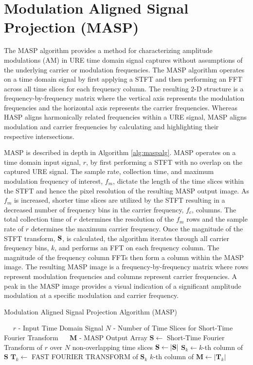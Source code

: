 \section[Modulation Aligned Signal Projection (MASP)]{Modulation Aligned Signal Projection (MASP)}
\label{Modulation Aligned Signal Projection}

The MASP algorithm provides a method for characterizing amplitude modulations (AM) in URE time domain signal captures without assumptions of the underlying carrier or modulation frequencies.  The MASP algorithm operates on a time domain signal by first applying a STFT and then performing an FFT across all time slices for each frequency column.  The resulting 2-D structure is a frequency-by-frequency matrix where the vertical axis represents the modulation frequencies and the horizontal axis represents the carrier frequencies. Whereas HASP aligns harmonically related frequencies within a URE signal, MASP aligns modulation and carrier frequencies by calculating and highlighting their respective intersections.

MASP is described in depth in Algorithm \ref{alg:maspalg}. MASP operates on a time domain input signal, $r$, by first performing a STFT with no overlap on the captured URE signal.  The sample rate, collection time, and maximum modulation frequency of interest, $f_m$, dictate the length of the time slices within the STFT and hence the pixel resolution of the resulting MASP output image.  As $f_m$ is increased, shorter time slices are utilized by the STFT resulting in a decreased number of frequency bins in the carrier frequency, $f_c$, columns.  The total collection time of $r$ determines the resolution of the $f_m$ rows and the sample rate of $r$ determines the maximum carrier frequency.  Once the magnitude of the STFT transform, $\bf{S}$, is calculated, the algorithm iterates through all carrier frequency bins, $k$, and performs an FFT on each frequency column.  The magnitude of the frequency column FFTs then form a column within the MASP image.  The resulting MASP image is a frequency-by-frequency matrix where rows represent modulation frequencies and columns represent carrier frequencies.  A peak in the MASP image provides a visual indication of a significant amplitude modulation at a specific modulation and carrier frequency.

\begin{algorithm}
	\caption{Modulation Aligned Signal Projection Algorithm (MASP)} \label{alg:maspalg}
	\scriptsize
	\begin{algorithmic}[1]
		\Require~~
		\Statex $r$ - Input Time Domain Signal
		\Statex $N$ - Number of Time Slices for Short-Time Fourier Transform
		\Ensure~~
		\Statex $\mathbf{M}$ - MASP Output Array
		\Statex
		\State $\mathbf{S} \gets $ Short-Time Fourier Transform of $r$ over $N$ non-overlapping time slices
		\State $\mathbf{S} \gets \left|\bf{S}\right|$ 
		\State      $\mathbf{S}_k \gets k$-th column of $\mathbf{S}$
		\State		$\mathbf{T}_k \gets $ FAST FOURIER TRANSFORM of $\mathbf{S}_k$
		\State		$k$-th column of $\mathbf{M} \gets \left|\mathbf{T}_k\right|$
		\EndFor
	\end{algorithmic}
\end{algorithm}

